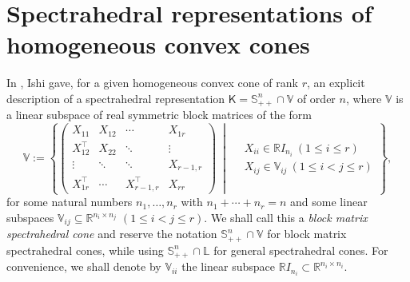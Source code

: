 \documentclass[oneside]{amsart}
\theoremstyle{plain}
\theoremstyle{definition}
\theoremstyle{remark}
\numberwithin{equation}{section}
\begin{document}
\section{Spectrahedral representations of homogeneous convex cones}
\label{section:spectrahedralrepresentations}

In \cite{Ishi15}, Ishi gave, for a given homogeneous convex cone of rank
$r$, an explicit description of a spectrahedral representation $\mathsf{K}
= \mathbb{S}^{n}_{++} \cap \mathbb{V}$ of order $n$, where $\mathbb{V}$ is
a linear subspace of real symmetric block matrices of the form
\begin{equation}\label{eq:spaceofsymmblockmatrix}%
\mathbb{V} := \left\{
\begin{pmatrix}
X_{11} & X_{12} & \cdots & X_{1r}
\\
X_{12}^{\top} & X_{22} & \ddots & \vdots
\\
\vdots & \ddots & \ddots & X_{r-1,r}
\\
X_{1r}^{\top} & \cdots & X_{r-1,r}^{\top} & X_{rr}
\end{pmatrix}
\ \middle|\
\begin{aligned}
&X_{ii} \in \mathbb{R} I_{n_{i}} \ (1 \leq i \leq r)
\\
&X_{ij} \in \mathbb{V}_{ij} \ (1 \leq i < j \leq r)
\end{aligned}
\right\},
\end{equation}
for some natural numbers $n_{1}, \dotsc, n_{r}$ with $n_{1} + \dotsb +
n_{r} = n$ and some linear subspaces $\mathbb{V}_{ij} \subseteq
\mathbb{R}^{n_{i} \times n_{j}}$ $(1 \leq i < j \leq r)$. We shall call
this a \emph{block matrix spectrahedral cone} and reserve the notation
$\mathbb{S}^{n}_{++} \cap \mathbb{V}$ for block matrix spectrahedral cones,
while using $\mathbb{S}^{n}_{++} \cap \mathbb{L}$ for general spectrahedral
cones. For convenience, we shall denote by $\mathbb{V}_{ii}$ the linear
subspace $\mathbb{R} I_{n_{i}} \subset \mathbb{R}^{n_{i} \times n_{i}}$.
\end{document}
